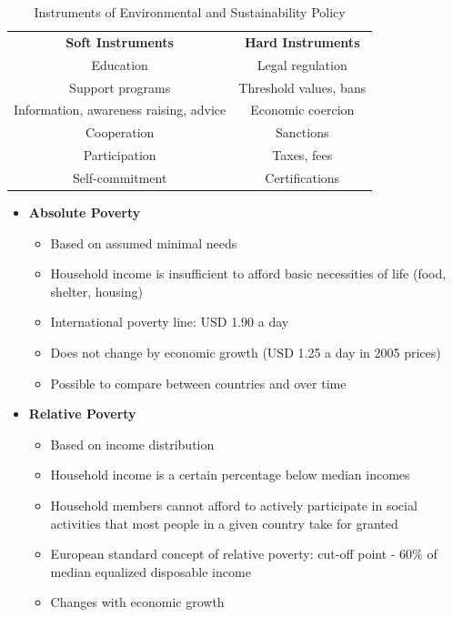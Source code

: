 \documentclass[11pt]{article}
\theoremstyle{definition}
\begin{document}
\begin{table}[H]
	\begin{tabularx}{\linewidth}{c c}
		\cellcolor{DodgerBlue1!40} \textbf{Soft Instruments} & \cellcolor{DodgerBlue1!40} \textbf{Hard Instruments}\\
		 Education & Legal regulation \\
		 Support programs & Threshold values, bans \\
		 Information, awareness raising, advice & Economic coercion \\
		 Cooperation & Sanctions \\
		 Participation & Taxes, fees \\
		 Self-commitment & Certifications
	\end{tabularx}
	\caption{Instruments of Environmental and Sustainability Policy}
\end{table}

\begin{itemize}[nosep]
	\item \textbf{Absolute Poverty}
	\begin{itemize}
		\item Based on assumed minimal needs
		\item Household income is insufficient to afford basic necessities of life (food, shelter, housing)
		\item International poverty line: USD 1.90 a day
		\item Does not change by economic growth (USD 1.25 a day in 2005 prices)
		\item Possible to compare between countries and over time
	\end{itemize}
	\item \textbf{Relative Poverty}
	\begin{itemize}
		\item Based on income distribution
		\item Household income is a certain percentage below median incomes
		\item Household members cannot afford to actively participate in social activities that most people in a given country take for granted
		\item European standard concept of relative poverty: cut-off point - 60\% of median equalized disposable income
		\item Changes with economic growth
	\end{itemize}
\end{itemize}
\end{document}
